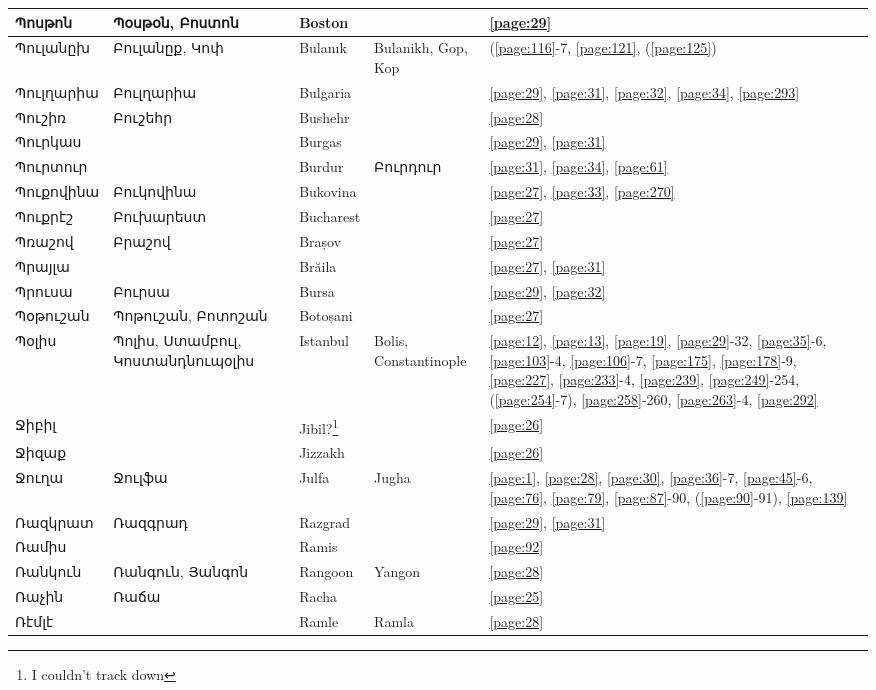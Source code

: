 \begin{center}
\begin{longtable}{|p{}|p{3cm}|p{3cm}|p{2cm}|p{3cm}|}
Պոսթոն&Պօսթօն, Բոստոն & Boston& &\ref{page:29}\\ \hline
Պուլանըխ&Բուլանըք, Կոփ & Bulanık  & Bulanikh, Gop, Kop &(\ref{page:116}-7, \ref{page:121}, (\ref{page:125})\\ \hline
Պուլղարիա& Բուլղարիա& Bulgaria& &\ref{page:29}, \ref{page:31}, \ref{page:32}, \ref{page:34}, \ref{page:293}\\ \hline
Պուշիռ& Բուշեհր&Bushehr & &\ref{page:28}\\ \hline
Պուրկաս& &Burgas & &\ref{page:29}, \ref{page:31}\\ \hline
Պուրտուր& & Burdur& Բուրդուր&\ref{page:31}, \ref{page:34}, \ref{page:61}\\ \hline
Պուքովինա& Բուկովինա& Bukovina& &\ref{page:27}, \ref{page:33}, \ref{page:270}\\ \hline
Պուքրէշ& Բուխարեստ& Bucharest& &\ref{page:27}\\ \hline
Պռաշով& Բրաշով&Brașov & &\ref{page:27}\\ \hline
Պրայլա& &Brăila & &\ref{page:27}, \ref{page:31}\\ \hline
Պրուսա&    Բուրսա& Bursa& &\ref{page:29}, \ref{page:32}\\ \hline
Պօթուշան& Պոթուշան, Բոտոշան&Botoșani & &\ref{page:27}\\ \hline
Պօլիս& Պոլիս, Ստամբուլ, Կոստանդնուպօլիս& Istanbul& Bolis, Constantinople &\ref{page:12}, \ref{page:13}, \ref{page:19}, \ref{page:29}-32, \ref{page:35}-6, \ref{page:103}-4, \ref{page:106}-7, \ref{page:175}, \ref{page:178}-9, \ref{page:227}, \ref{page:233}-4, \ref{page:239}, \ref{page:249}-254, (\ref{page:254}-7), \ref{page:258}-260, \ref{page:263}-4, \ref{page:292}\\ \hline
Ջիբիլ& &Jibil?\footnote{I couldn't track down} & &\ref{page:26}\\ \hline
Ջիզաք& &Jizzakh & &\ref{page:26}\\ \hline
Ջուղա&Ջուլֆա & 
Julfa&Jugha &\ref{page:1}, \ref{page:28}, \ref{page:30}, \ref{page:36}-7, \ref{page:45}-6, \ref{page:76}, \ref{page:79}, \ref{page:87}-90, (\ref{page:90}-91), \ref{page:139}\\ \hline
Ռազկրատ& Ռազգրադ&Razgrad & &\ref{page:29}, \ref{page:31}\\ \hline
Ռամիս& & Ramis& &\ref{page:92}\\ \hline
Ռանկուն& Ռանգուն, Յանգոն  & Rangoon&Yangon &\ref{page:28}\\ \hline
Ռաչին&  Ռաճա& Racha& &\ref{page:25}\\ \hline
Ռէմլէ&   & Ramle &Ramla &\ref{page:28}\\ \hline

\end{longtable}
\end{center}
